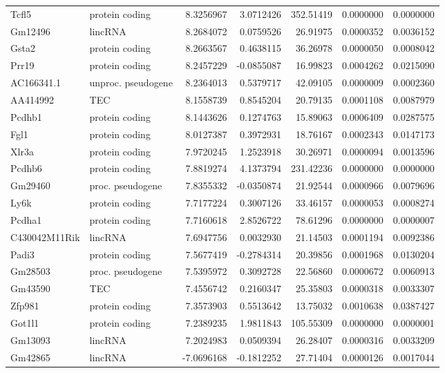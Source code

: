 \documentclass[onehalf,12pt]{beavtex}
\begin{document}
\begin{longtable}{llrrrrr}
  Tcfl5 & protein coding & 8.3256967 & 3.0712426 & 352.51419 & 0.0000000 & 0.0000000\\
  Gm12496 & lincRNA & 8.2684072 & 0.0759526 & 26.91975 & 0.0000352 & 0.0036152\\
  Gsta2 & protein coding & 8.2663567 & 0.4638115 & 36.26978 & 0.0000050 & 0.0008042\\
  Prr19 & protein coding & 8.2457229 & -0.0855087 & 16.99823 & 0.0004262 & 0.0215090\\
  \addlinespace
  AC166341.1 & unproc. pseudogene & 8.2364013 & 0.5379717 & 42.09105 & 0.0000009 & 0.0002360\\
  AA414992 & TEC & 8.1558739 & 0.8545204 & 20.79135 & 0.0001108 & 0.0087979\\
  Pcdhb1 & protein coding & 8.1443626 & 0.1274763 & 15.89063 & 0.0006409 & 0.0287575\\
  Fgl1 & protein coding & 8.0127387 & 0.3972931 & 18.76167 & 0.0002343 & 0.0147173\\
  Xlr3a & protein coding & 7.9720245 & 1.2523918 & 30.26971 & 0.0000094 & 0.0013596\\
  \addlinespace
  Pcdhb6 & protein coding & 7.8819274 & 4.1373794 & 231.42236 & 0.0000000 & 0.0000000\\
  Gm29460 & proc. pseudogene & 7.8355332 & -0.0350874 & 21.92544 & 0.0000966 & 0.0079696\\
  Ly6k & protein coding & 7.7177224 & 0.3007126 & 33.46157 & 0.0000053 & 0.0008274\\
  Pcdha1 & protein coding & 7.7160618 & 2.8526722 & 78.61296 & 0.0000000 & 0.0000007\\
  C430042M11Rik & lincRNA & 7.6947756 & 0.0032930 & 21.14503 & 0.0001194 & 0.0092386\\
  \addlinespace
  Padi3 & protein coding & 7.5677419 & -0.2784314 & 20.39856 & 0.0001968 & 0.0130204\\
  Gm28503 & proc. pseudogene & 7.5395972 & 0.3092728 & 22.56860 & 0.0000672 & 0.0060913\\
  Gm43590 & TEC & 7.4556742 & 0.2160347 & 25.35803 & 0.0000318 & 0.0033307\\
  Zfp981 & protein coding & 7.3573903 & 0.5513642 & 13.75032 & 0.0010638 & 0.0387427\\
  Got1l1 & protein coding & 7.2389235 & 1.9811843 & 105.55309 & 0.0000000 & 0.0000001\\
  \addlinespace
  Gm13093 & lincRNA & 7.2024983 & 0.0509394 & 26.28407 & 0.0000316 & 0.0033209\\
  Gm42865 & lincRNA & -7.0696168 & -0.1812252 & 27.71404 & 0.0000126 & 0.0017044\\

\end{longtable}
\end{document}
